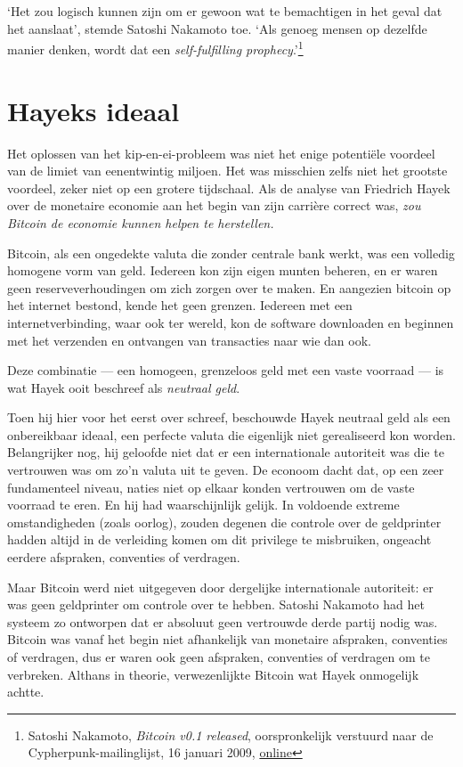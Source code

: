 \documentclass[
  a5paper,
  smalldemyvopaper,11pt,twoside,onecolumn,openright,extrafontsizes,
hidelinks]{memoir}
\begin{document}
`Het zou logisch kunnen zijn om er gewoon wat te bemachtigen in het
geval dat het aanslaat', stemde Satoshi Nakamoto toe. `Als genoeg mensen
op dezelfde manier denken, wordt dat een \emph{self-fulfilling
prophecy}.'\footnote{Satoshi Nakamoto, \emph{Bitcoin v0.1 released},
  oorspronkelijk verstuurd naar de Cypherpunk-mailinglijst, 16 januari
  2009,
  \href{https://www.metzdowd.com/pipermail/cryptography/2009-January/015014.html}{online}}

\section{Hayeks ideaal}\label{hayeks-ideaal}

Het oplossen van het kip-en-ei-probleem was niet het enige potentiële
voordeel van de limiet van eenentwintig miljoen. Het was misschien zelfs
niet het grootste voordeel, zeker niet op een grotere tijdschaal. Als de
analyse van Friedrich Hayek over de monetaire economie aan het begin van
zijn carrière correct was, \emph{zou Bitcoin de economie kunnen helpen
te herstellen.}

Bitcoin, als een ongedekte valuta die zonder centrale bank werkt, was
een volledig homogene vorm van geld. Iedereen kon zijn eigen munten
beheren, en er waren geen reserveverhoudingen om zich zorgen over te
maken. En aangezien bitcoin op het internet bestond, kende het geen
grenzen. Iedereen met een internetverbinding, waar ook ter wereld, kon
de software downloaden en beginnen met het verzenden en ontvangen van
transacties naar wie dan ook.

Deze combinatie --- een homogeen, grenzeloos geld met een vaste voorraad
--- is wat Hayek ooit beschreef als \emph{neutraal geld}.

Toen hij hier voor het eerst over schreef, beschouwde Hayek neutraal
geld als een onbereikbaar ideaal, een perfecte valuta die eigenlijk niet
gerealiseerd kon worden. Belangrijker nog, hij geloofde niet dat er een
internationale autoriteit was die te vertrouwen was om zo'n valuta uit
te geven. De econoom dacht dat, op een zeer fundamenteel niveau, naties
niet op elkaar konden vertrouwen om de vaste voorraad te eren. En hij
had waarschijnlijk gelijk. In voldoende extreme omstandigheden (zoals
oorlog), zouden degenen die controle over de geldprinter hadden altijd
in de verleiding komen om dit privilege te misbruiken, ongeacht eerdere
afspraken, conventies of verdragen.

Maar Bitcoin werd niet uitgegeven door dergelijke internationale
autoriteit: er was geen geldprinter om controle over te hebben. Satoshi
Nakamoto had het systeem zo ontworpen dat er absoluut geen vertrouwde
derde partij nodig was. Bitcoin was vanaf het begin niet afhankelijk van
monetaire afspraken, conventies of verdragen, dus er waren ook geen
afspraken, conventies of verdragen om te verbreken. Althans in theorie,
verwezenlijkte Bitcoin wat Hayek onmogelijk achtte.
\end{document}
